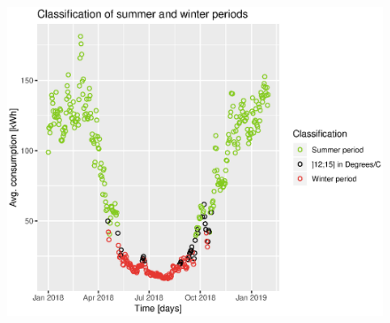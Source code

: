 \begin{figure}
    \centering
    \includegraphics[width=1.\textwidth]{../../../figures/class_breakpoint.eps}
    \caption{}
    \label{fig: class_breakpoint}
\end{figure}
